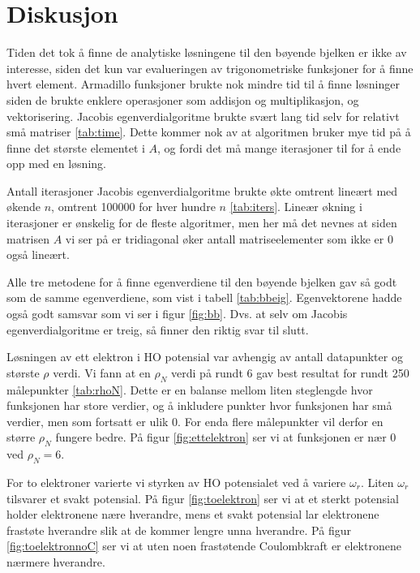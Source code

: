 \documentclass[reprint,english,notitlepage]{revtex4-1}
\begin{document}
\section{Diskusjon} %
	Tiden det tok å finne de analytiske løsningene til den bøyende bjelken er ikke av interesse, siden det kun var evalueringen av trigonometriske funksjoner for å finne hvert element. Armadillo funksjoner brukte nok mindre tid til å finne løsninger siden de brukte enklere operasjoner som addisjon og multiplikasjon, og vektorisering. Jacobis egenverdialgoritme brukte svært lang tid selv for relativt små matriser \ref{tab:time}. Dette kommer nok av at algoritmen bruker mye tid på å finne det største elementet i $A$, og fordi det må mange iterasjoner til for å ende opp med en løsning.
	
	Antall iterasjoner Jacobis egenverdialgoritme brukte økte omtrent lineært med økende $n$, omtrent 100000 for hver hundre $n$ \ref{tab:iters}. Lineær økning i iterasjoner er ønskelig for de fleste algoritmer, men her må det nevnes at siden matrisen $A$ vi ser på er tridiagonal øker antall matriseelementer som ikke er 0 også lineært.
	
	Alle tre metodene for å finne egenverdiene til den bøyende bjelken gav så godt som de samme egenverdiene, som vist i tabell \ref{tab:bbeig}. Egenvektorene hadde også godt samsvar som vi ser i figur \ref{fig:bb}. Dvs. at selv om Jacobis egenverdialgoritme er treig, så finner den riktig svar til slutt.
	
	Løsningen av ett elektron i HO potensial var avhengig av antall datapunkter og største $\rho$ verdi. Vi fann at en $\rho_N$ verdi på rundt 6 gav best resultat for rundt 250 målepunkter \ref{tab:rhoN}. Dette er en balanse mellom liten steglengde hvor funksjonen har store verdier, og å inkludere punkter hvor funksjonen har små verdier, men som fortsatt er ulik 0. For enda flere målepunkter vil derfor en større $\rho_N$ fungere bedre. På figur \ref{fig:ettelektron} ser vi at funksjonen er nær 0 ved $\rho_N = 6$.
	
	For to elektroner varierte vi styrken av HO potensialet ved å variere $\omega_r$. Liten $\omega_r$ tilsvarer et svakt potensial. På figur \ref{fig:toelektron} ser vi at et sterkt potensial holder elektronene nære hverandre, mens et svakt potensial lar elektronene frastøte hverandre slik at de kommer lengre unna hverandre. På figur \ref{fig:toelektronnoC} ser vi at uten noen frastøtende Coulombkraft er elektronene nærmere hverandre.
	
\end{document}
